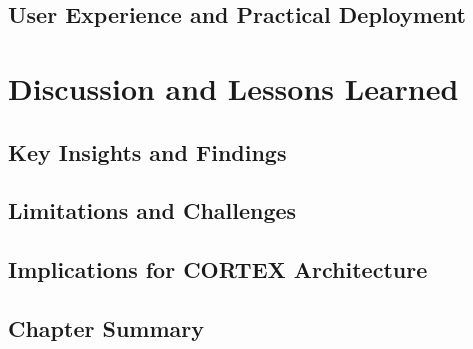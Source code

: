 \subsection{User Experience and Practical Deployment}

\section{Discussion and Lessons Learned}

\subsection{Key Insights and Findings}

\subsection{Limitations and Challenges}

\subsection{Implications for CORTEX Architecture}

\subsection{Chapter Summary}

